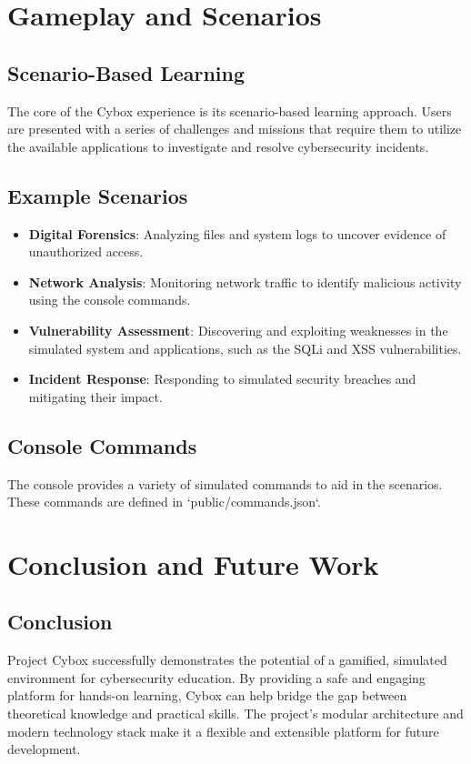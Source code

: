 \documentclass{report}
\begin{document}
\chapter{Gameplay and Scenarios}

\section{Scenario-Based Learning}
The core of the Cybox experience is its scenario-based learning approach. Users are presented with a series of challenges and missions that require them to utilize the available applications to investigate and resolve cybersecurity incidents.

\section{Example Scenarios}
\begin{itemize}
    \item \textbf{Digital Forensics}: Analyzing files and system logs to uncover evidence of unauthorized access.
    \item \textbf{Network Analysis}: Monitoring network traffic to identify malicious activity using the console commands.
    \item \textbf{Vulnerability Assessment}: Discovering and exploiting weaknesses in the simulated system and applications, such as the SQLi and XSS vulnerabilities.
    \item \textbf{Incident Response}: Responding to simulated security breaches and mitigating their impact.
\end{itemize}

\section{Console Commands}
The console provides a variety of simulated commands to aid in the scenarios. These commands are defined in `public/commands.json`.



\chapter{Conclusion and Future Work}

\section{Conclusion}
Project Cybox successfully demonstrates the potential of a gamified, simulated environment for cybersecurity education. By providing a safe and engaging platform for hands-on learning, Cybox can help bridge the gap between theoretical knowledge and practical skills. The project's modular architecture and modern technology stack make it a flexible and extensible platform for future development.
\end{document}
